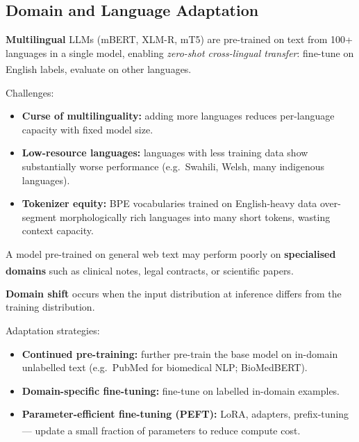 
\subsection{Domain and Language Adaptation}

\begin{tcbitemize}[ skin=sectionraster ]

    \tcbitem[title=Multilingual Models, raster multicolumn=3]
    \textbf{Multilingual} LLMs (mBERT, XLM-R, mT5) are pre-trained on text from 100+
    languages in a single model, enabling \emph{zero-shot cross-lingual transfer}:
    fine-tune on English labels, evaluate on other
    languages.\textsuperscript{\cite[][p.~26]{farrisHowLargeLanguage2025}}

    Challenges:
    \begin{itemize}
        \item \textbf{Curse of multilinguality:} adding more languages reduces
              per-language capacity with fixed model size.
        \item \textbf{Low-resource languages:} languages with less training data show
              substantially worse performance (e.g.\ Swahili, Welsh, many indigenous
              languages).
        \item \textbf{Tokenizer equity:} BPE vocabularies trained on English-heavy data
              over-segment morphologically rich languages into many short tokens, wasting
              context capacity.
    \end{itemize}

    \tcbitem[title={Domain Shift and Low-Resource Adaptation}, raster multicolumn=3]
    A model pre-trained on general web text may perform poorly on \textbf{specialised
    domains} such as clinical notes, legal contracts, or scientific
    papers.\textsuperscript{\cite[][p.~170]{raschkaBuildLargeLanguage2025}}

    \textbf{Domain shift} occurs when the input distribution at inference differs from
    the training distribution.

    Adaptation strategies:
    \begin{itemize}
        \item \textbf{Continued pre-training:} further pre-train the base model on
              in-domain unlabelled text (e.g.\ PubMed for biomedical NLP; BioMedBERT).
        \item \textbf{Domain-specific fine-tuning:} fine-tune on labelled in-domain
              examples.
        \item \textbf{Parameter-efficient fine-tuning (PEFT):} LoRA, adapters,
              prefix-tuning --- update a small fraction of parameters to reduce compute
              cost.\textsuperscript{\cite[][p.~322]{raschkaBuildLargeLanguage2025}}
    \end{itemize}

\end{tcbitemize}

